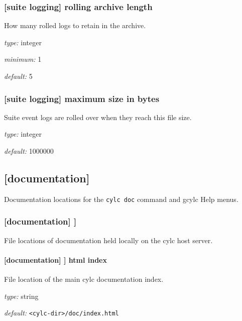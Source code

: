 \subsubsection[rolling archive length]{[suite logging] \textrightarrow rolling archive length}

How many rolled logs to retain in the archive.

\begin{myitemize}
\item {\em type:} integer
\item {\em minimum:} 1
\item {\em default:} 5
\end{myitemize}

\subsubsection[maximum size in bytes]{[suite logging] \textrightarrow maximum size in bytes}

Suite event logs are rolled over when they reach this file size.

\begin{myitemize}
\item {\em type:} integer
\item {\em default:} 1000000
\end{myitemize}

\subsection{[documentation]}

Documentation locations for the \lstinline=cylc doc= command and gcylc
Help menus.

\subsubsection[{[[}files{]]}]{[documentation] \textrightarrow [[files]]}

File locations of documentation held locally on the cylc host server.

\paragraph[html index]{[documentation] \textrightarrow [[files]] \textrightarrow html index }

File location of the main cylc documentation index.
\begin{myitemize}
\item {\em type:} string
\item {\em default:} \lstinline=<cylc-dir>/doc/index.html=
\end{myitemize}

